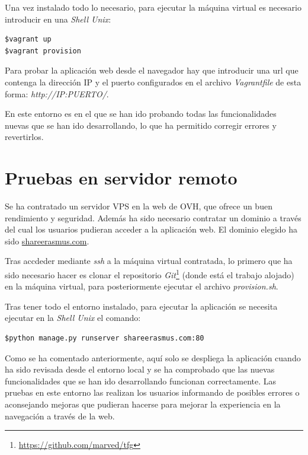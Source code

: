 \documentclass[a4paper, 12pt]{book}
\begin{document}
Una vez instalado todo lo necesario, para ejecutar la máquina virtual es necesario introducir en una \textit{Shell Unix}: \begin{verbatim} 
$vagrant up 
$vagrant provision
\end{verbatim}  

 Para probar la aplicación web desde el navegador hay que introducir una url que contenga la dirección IP y el puerto configurados en el archivo \textit{Vagrantfile} de esta forma: \textit{http://IP:PUERTO/}.
\newline

En este entorno es en el que se han ido probando todas las funcionalidades nuevas que se han ido desarrollando, lo que ha permitido corregir errores y revertirlos.

\section{Pruebas en servidor remoto} 
\label{sec:pruebas-en-servidor-remoto}

Se ha contratado un servidor VPS en la web de OVH, que ofrece un buen rendimiento y seguridad. Además ha sido necesario contratar un dominio a través del cual los usuarios pudieran acceder a la aplicación web. El dominio elegido ha sido \url{shareerasmus.com}.
\newline

Tras accdeder mediante \textit{ssh} a la máquina virtual contratada, lo primero que ha sido necesario hacer es clonar el repositorio \textit{Git}\footnote{\url{https://github.com/marved/tfg}} (donde está el trabajo alojado) en la máquina virtual, para posteriormente ejecutar el archivo \textit{provision.sh}. 
\newline

Tras tener todo el entorno instalado, para ejecutar la aplicación se necesita ejecutar en la \textit{Shell Unix} el comando:
\begin{verbatim} 
$python manage.py runserver shareerasmus.com:80
\end{verbatim}  

Como se ha comentado anteriormente, aquí solo se despliega la aplicación cuando ha sido revisada desde el entorno local y se ha comprobado que las nuevas funcionalidades que se han ido desarrollando funcionan correctamente. Las pruebas en este entorno las realizan los usuarios informando de posibles errores o aconsejando mejoras que pudieran hacerse para mejorar la experiencia en la navegación a través de la web.
\end{document}

